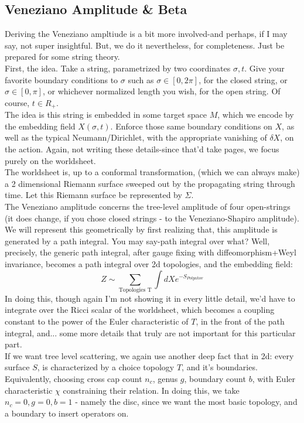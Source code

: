 \documentclass{article}
\begin{document}
\subsection{Veneziano Amplitude \& Beta}
Deriving the Veneziano ampltiude is a bit more involved-and perhaps, if I may say, not super insightful. But, we do it nevertheless, for completeness. Just be prepared for some string theory. \\
First, the idea. Take a string, parametrized by two coordinates $\sigma,t$. Give your favorite boundary conditions to $\sigma$ such as $\sigma\in[0,2\pi]$, for the closed string, or $\sigma\in[0,\pi]$, or whichever normalized length you wish, for the open string. Of course, $t\in R_{+}$. \\
The idea is this string is embedded in some target space $M$, which we encode by the embedding field $X(\sigma,t)$. Enforce those same boundary conditions on $X$, as well as the typical Neumann/Dirichlet, with the appropriate vanishing of $\delta X$, on the action. Again, not writing these details-since that'd take pages, we focus purely on the worldsheet.\\
The worldsheet is, up to a conformal transformation, (which we can always make) a 2 dimensional Riemann surface sweeped out by the propagating string through time. Let this Riemann surface be represented by $\Sigma$. \\
The Veneziano amplitude concerns the tree-level amplitude of four open-strings (it does change, if you chose closed strings - to the Veneziano-Shapiro amplitude). We will represent this geometrically by first realizing that, this amplitude is generated by a path integral. You may say-path integral over what? Well, precisely, the generic path integral, after gauge fixing with diffeomorphism+Weyl invariance, becomes a path integral over 2d topologies, and the embedding field:
\begin{equation}
    Z \sim\sum_{\text{Topologies T}} \int dX e^{-S_{Polyakov}}
\end{equation}
In doing this, though again I'm not showing it in every little detail, we'd have to integrate over the Ricci scalar of the worldsheet, which becomes a coupling constant to the power of the Euler characteristic of $T$, in the front of the path integral, and... some more details that truly are not important for this particular part.\\
If we want tree level scattering, we again use  another deep fact that in 2d: every surface $S$, is characterized by a choice topology $T$, and it's boundaries. Equivalently, choosing cross cap count $n_c$, genus $g$, boundary count $b$, with Euler characteristic $\chi$ constraining their relation. In doing this, we take $n_c=0,g=0,b=1$ - namely the disc, since we want the most basic topology, and a boundary to insert operators on. \\
\end{document}
